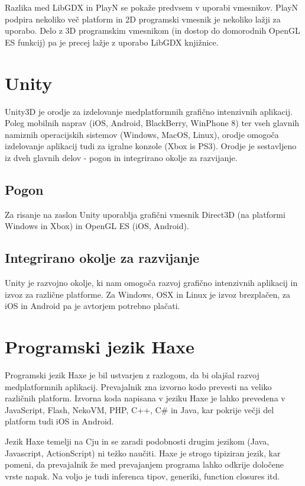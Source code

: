 Razlika med LibGDX in PlayN se pokaže predvsem v uporabi vmesnikov. PlayN podpira nekoliko več platform in 2D programski vmesnik je nekoliko lažji za uporabo. Delo z 3D programskim vmesnikom (in dostop do domorodnih OpenGL ES funkcij) pa je precej lažje z uporabo LibGDX knjižnice. 

\section{Unity}

Unity3D\cite{unity} je orodje za izdelovanje medplatformnih grafično intenzivnih aplikacij. Poleg mobilnih naprav (iOS, Android, BlackBerry, WinPhone 8) ter vseh glavnih namiznih operacijskih sistemov (Windows, MacOS, Linux), orodje omogoča izdelovanje aplikacij tudi za igralne konzole (Xbox is PS3). Orodje je sestavljeno iz dveh glavnih delov - pogon in integrirano okolje za razvijanje.

\subsection{Pogon}

Za risanje na zaslon Unity uporablja grafični vmesnik Direct3D (na platformi Windows in Xbox) in OpenGL ES (iOS, Android). 

\subsection{Integrirano okolje za razvijanje} 

Unity je razvojno okolje, ki nam omogoča razvoj grafično intenzivnih aplikacij in izvoz za različne platforme. Za Windows, OSX in Linux je izvoz brezplačen, za iOS in Android pa je avtorjem potrebno plačati.


\section{Programski jezik Haxe}
\label{sec:haxe}
Programski jezik Haxe je bil ustvarjen z razlogom, da bi olajšal razvoj medplatformnih aplikacij. Prevajalnik zna izvorno kodo prevesti na veliko različnih platform. Izvorna koda napisana v jeziku Haxe je lahko prevedena v JavaScript, Flash, NekoVM, PHP, C++, C\# in Java, kar pokrije večji del platform tudi iOS in Android.

Jezik Haxe temelji na Cju in se zaradi podobnosti drugim jezikom (Java, Javascript, ActionScript) ni težko naučiti. Haxe je strogo tipiziran jezik, kar pomeni, da prevajalnik že med prevajanjem programa lahko odkrije določene vrste napak. Na voljo je tudi inferenca tipov, generiki, function closures itd. 

